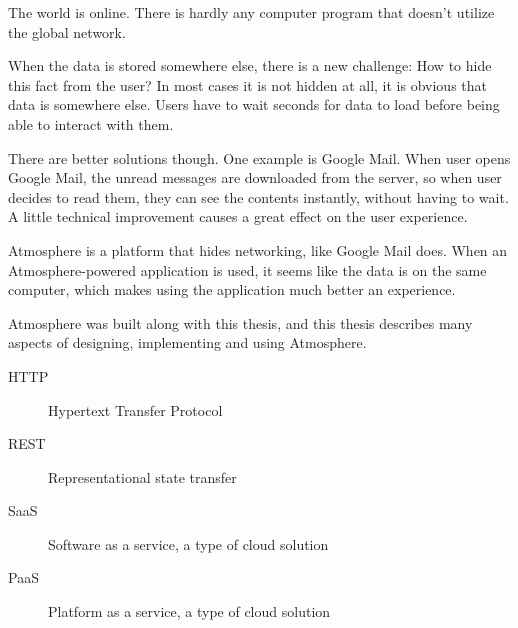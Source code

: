 \documentclass[]{tukethesis}
\begin{document}
\preface %
The world is online. There is hardly any computer program that doesn’t utilize the global network. 

When the data is stored somewhere else, there is a new challenge: How to hide this fact from the user? In most cases it is not hidden at all, it is obvious that data is somewhere else. Users have to wait seconds for data to load before being able to interact with them.

There are better solutions though. One example is Google Mail. When user opens Google Mail, the unread messages are downloaded from the server, so when user decides to read them, they can see the contents instantly, without having to wait. A little technical improvement causes a great effect on the user experience.

Atmosphere is a platform that hides networking, like Google Mail does. When an Atmosphere-powered application is used, it seems like the data is on the same computer, which makes using the application much better an experience.

Atmosphere was built along with this thesis, and this thesis describes many aspects of designing, implementing and using Atmosphere.
\endpreface

\thispagestyle{empty}
\tableofcontents
\newpage

\thispagestyle{empty}
\listoffigures
\newpage

\thispagestyle{empty}
\listoftables
\newpage


\listofterms %

\begin{description}
\item[HTTP] Hypertext Transfer Protocol
\item[REST] Representational state transfer
\item[SaaS] Software as a service, a type of cloud solution
\item[PaaS] Platform as a service, a type of cloud solution
\end{description}

\setlength{\parindent}{1cm} 
\setlength{\parskip}{0cm}
\end{document}
